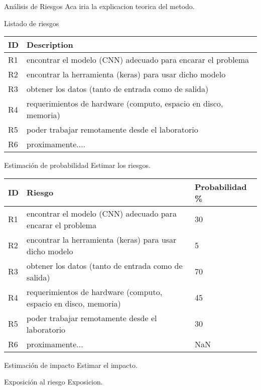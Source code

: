 \documentclass{scrartcl}
\begin{document}
		\cleardoublepage
		\begin{subsection}{Análisis de Riesgos}
			Aca iria la explicacion teorica del metodo.
			\begin{subsubsection}{Listado de riesgos}
				\begin{table}[!h]
					\begin{tabular}{|l|l|}
					\hline
					ID & Description\\  \hline \hline
					R1 & encontrar el modelo (CNN) adecuado para encarar el problema\\  \hline
					R2 & encontrar la herramienta (keras) para usar dicho modelo\\  \hline
					R3 & obtener los datos (tanto de entrada como de salida)\\  \hline
					R4 & requerimientos de hardware (computo, espacio en disco, memoria)\\  \hline
					R5 & poder trabajar remotamente desde el laboratorio\\  \hline
					R6 & proximamente....\\  \hline
					\end{tabular}
				\end{table}
			\end{subsubsection}
			\begin{subsubsection}{Estimación de probabilidad}
				Estimar los riesgos.
				\begin{table}[!h]
					\begin{tabular}{|l|l|l|}
					\hline
					ID & Riesgo & Probabilidad \%\\  \hline \hline
					R1 & encontrar el modelo (CNN) adecuado para encarar el problema & 30\\  \hline
					R2 & encontrar la herramienta (keras) para usar dicho modelo& 5\\  \hline
					R3 & obtener los datos (tanto de entrada como de salida)& 70\\  \hline
					R4 & requerimientos de hardware (computo, espacio en disco, memoria)& 45\\  \hline
					R5 & poder trabajar remotamente desde el laboratorio& 30\\  \hline
					R6 & proximamente...& NaN\\  \hline
					\end{tabular}
				\end{table}
			\end{subsubsection}
			\begin{subsubsection}{Estimación de impacto}
				Estimar el impacto.
			\end{subsubsection}
			\begin{subsubsection}{Exposición al riesgo}
				Exposicion.
			\end{subsubsection}
		\end{subsection}
\end{document}
